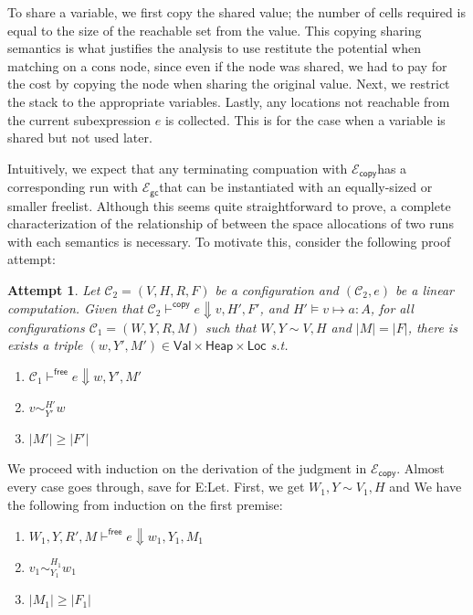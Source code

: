 \documentclass{easychair}
\newcommand{\ms}[1]{\ensuremath{\mathsf{#1}}}
\newcommand{\veq}[4]{#3 \sim^{#1}_{#2} #4}
\newcommand{\gcSem}{\ensuremath{\mathcal{E}_{\ms{gc}}}}
\newcommand{\copySem}{\ensuremath{\mathcal{E}_{\ms{copy}}}}
\newtheorem{attempt}[theorem]{Attempt}
\theoremstyle{definition}
\begin{document}
To share a variable, we first copy the shared value; the number of cells required is equal to the
size of the reachable set from the value. This copying sharing semantics is what justifies the 
analysis to use restitute the potential when matching on a cons node, 
since even if the node was shared, we had to pay for the cost by copying the node when sharing the 
original value. Next, we restrict the stack to the appropriate variables. 
Lastly, any locations not reachable from the current subexpression $e$ is collected. This is 
for the case when a variable is shared but not used later.  

Intuitively, we expect that any terminating compuation
with \copySem has a corresponding run with \gcSem that can be instantiated with 
an equally-sized or smaller freelist. Although this seems quite straightforward to prove, a complete
characterization of the relationship of between the space allocations of two runs with each 
semantics is necessary. To motivate this, consider the following proof attempt: 

\begin{attempt}
	Let $\mathcal{C_2} = (V,H,R,F)$ be a configuration and $(\mathcal{C_2}, e)$ 
	be a linear computation. Given that 
	$\mathcal{C}_2 \vdash^{\mathsf{copy}} e \Downarrow v,H',F'$, and $H' \vDash v \mapsto a : A$, 
	for all configurations $\mathcal{C}_1 = (W,Y,R,M)$ such that $W,Y \sim V,H$ and $|M| = |F|$,
there is exists a triple
$(w,Y',M') \in \ms{Val} \times \ms{Heap} \times \ms{Loc}$ s.t.
	\begin{enumerate}
			\item $\mathcal{C}_1 \vdash^{\mathsf{free}} e \Downarrow w,Y',M'$
			\item $\veq{H'}{Y'}{v}{w}$
			\item $|M'| \ge |F'|$
	\end{enumerate}
\end{attempt}

We proceed with induction on the derivation of the judgment in \copySem. 
Almost every case goes through, save for E:Let. 
First, we get $W_1,Y \sim V_1,H$ and We have the following from induction on the first premise:

\begin{enumerate}
	\item $W_1,Y,R',M \vdash^{\mathsf{free}} e \Downarrow w_1,Y_1,M_1$
	\item $\veq{H_1}{Y_1}{v_1}{w_1}$
	\item $|M_1| \ge |F_1|$
\end{enumerate}
\end{document}
